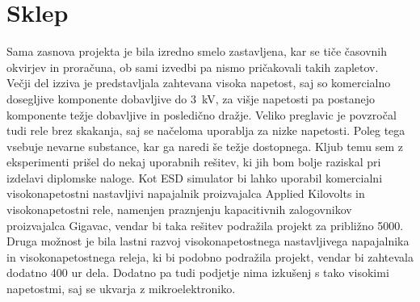 \documentclass[a4paper,twoside,openright,12pt,Slovene]{book}
\begin{document}
\chapter{Sklep} \label{Sklep}

Sama zasnova projekta je bila izredno smelo zastavljena, kar se tiče časovnih okvirjev in proračuna, ob sami izvedbi pa nismo pričakovali takih zapletov.
~\\Večji del izziva je predstavljala zahtevana visoka napetost, saj so komercialno
dosegljive komponente dobavljive do \SI{3}{\kilo\volt}, za višje napetosti pa postanejo komponente težje dobavljive in posledično dražje. Veliko preglavic je povzročal tudi rele brez skakanja, saj se načeloma uporablja za nizke napetosti. Poleg tega vsebuje nevarne substance, kar ga naredi še težje dostopnega. Kljub temu sem z eksperimenti prišel do nekaj uporabnih rešitev, ki jih bom bolje raziskal pri izdelavi diplomske naloge. Kot ESD simulator bi lahko uporabil komercialni visokonapetostni nastavljivi napajalnik proizvajalca Applied Kilovolts in visokonapetostni rele, namenjen praznjenju kapacitivnih zalogovnikov
proizvajalca Gigavac, vendar bi taka rešitev podražila projekt za približno 5000\texteuro . Druga možnost je bila lastni razvoj visokonapetostnega nastavljivega
napajalnika in visokonapetostnega releja, ki bi podobno podražila projekt, vendar bi zahtevala dodatno 400 ur dela. Dodatno pa tudi podjetje nima izkušenj s tako visokimi napetostmi, saj se ukvarja z mikroelektroniko.


	
 
\end{document}

